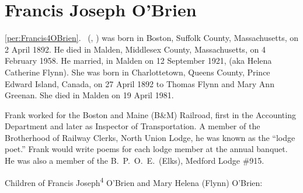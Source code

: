 \section{Francis Joseph O'Brien}

\ref{per:Francis4OBrien}.\  (, ) was born in Boston, Suffolk County, Massachusetts, on 2 April 1892.\cite{Francis4OBrienBirth} He died in Malden, Middlesex County, Massachusetts, on 4 February 1958.\cite{Francis4OBrienDeath} He married, in Malden on 12 September 1921,  (aka Helena Catherine Flynn).\cite{Francis4OBrienMarriageCert} She was born in Charlottetown, Queens County, Prince Edward Island, Canada, on 27 April 1892 to Thomas Flynn and Mary Ann Greenan.\cite{MaryFlynnBirth} She died in Malden on 19 April 1981.\cite{MaryFlynnDeath}

Frank worked for the Boston and Maine (B\&M) Railroad, first in the Accounting Department\cite{Francis4OBrienAccounting} and later as Inspector of Transportation.\cite{Francis4OBrienInspector} A member of the Brotherhood of Railway Clerks, North Union Lodge, he was known as the ``lodge poet.'' Frank would write poems for each lodge member at the annual banquet.\cite{Francis4OBrienPoet} He was also a member of the B.\ P.\ O.\ E.\ (Elks), Medford Lodge \#915.\cite{Francis4OBrienBPOE}

\begin{KidsIntro}
	Children of Francis Joseph\textsuperscript{4} O'Brien and Mary Helena (Flynn) O'Brien:
\end{KidsIntro}

\begin{Kids}
	
	
	
	
\end{Kids}